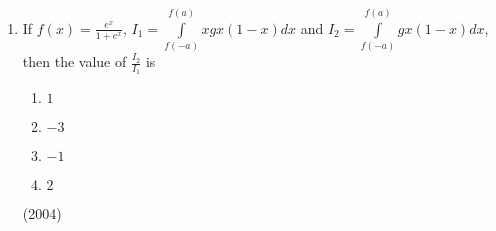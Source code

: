 \documentclass[journal,12pt,twocolumn]{IEEEtran}
\theoremstyle{remark}
\begin{document}
\begin{enumerate}
			\begin{enumerate}
				\item $2\pi$
				\item $\pi$
				\item $\frac{\pi}{4}$
				\item $0$
			\end{enumerate}
			\hfill (2004)
	\item
		If $f(x)= \frac{e^x}{1+e^x}, \, I_1=\int \limits_{f(-a)}^{f(a)}x g{x(1-x)}dx$ and $I_2 = \int \limits_{f(-a)}^{f(a)}g{x(1-x)}dx$, then the value of $\frac{I_2}{I_1}$ is 
			\begin{enumerate}
				\item $1$
				\item $-3$
				\item $-1$
				\item $2$
			\end{enumerate}
			\hfill (2004)
\end{enumerate}
\end{document}
